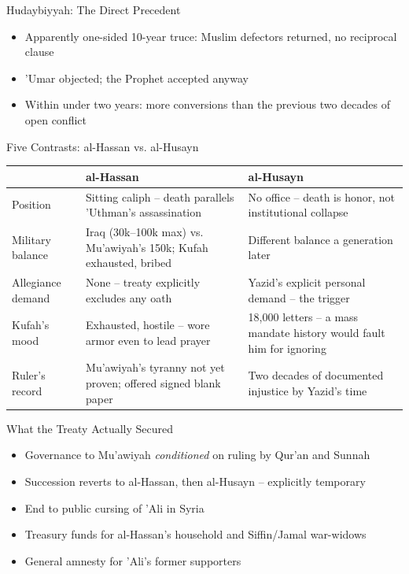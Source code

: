 \begin{frame}{Hudaybiyyah: The Direct Precedent}
\begin{itemize}[itemsep=5pt]
  \item Apparently one-sided 10-year truce: Muslim defectors returned, no reciprocal clause
  \item 'Umar objected; the Prophet accepted anyway
  \item Within under two years: more conversions than the previous two decades of open conflict
\end{itemize}
\end{frame}

\begin{frame}{Five Contrasts: al-Hassan vs. al-Husayn}
\centering\scriptsize
\renewcommand{\arraystretch}{1.4}
\begin{tabular}{|l|p{4.7cm}|p{4.7cm}|}\hline
&\textbf{al-Hassan}&\textbf{al-Husayn}\\\hline
Position & Sitting caliph -- death parallels 'Uthman's assassination & No office -- death is honor, not institutional collapse\\\hline
Military balance & Iraq (30k--100k max) vs. Mu'awiyah's 150k; Kufah exhausted, bribed & Different balance a generation later\\\hline
Allegiance demand & None -- treaty explicitly excludes any oath & Yazid's explicit personal demand -- the trigger\\\hline
Kufah's mood & Exhausted, hostile -- wore armor even to lead prayer & 18{,}000 letters -- a mass mandate history would fault him for ignoring\\\hline
Ruler's record & Mu'awiyah's tyranny not yet proven; offered signed blank paper & Two decades of documented injustice by Yazid's time\\\hline
\end{tabular}
\end{frame}

\begin{frame}{What the Treaty Actually Secured}
\begin{itemize}[itemsep=4pt]
  \item Governance to Mu'awiyah \emph{conditioned} on ruling by Qur'an and Sunnah
  \item Succession reverts to al-Hassan, then al-Husayn -- explicitly temporary
  \item End to public cursing of 'Ali in Syria
  \item Treasury funds for al-Hassan's household and Siffin/Jamal war-widows
  \item General amnesty for 'Ali's former supporters
\end{itemize}
\end{frame}

